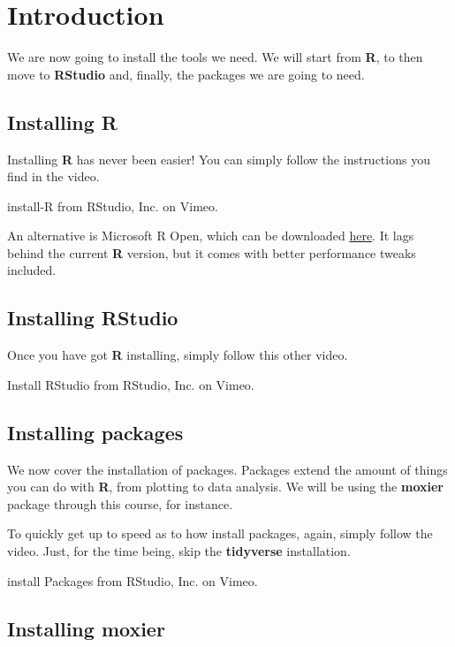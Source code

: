 \documentclass[]{book}
\begin{document}
\chapter{Introduction}\label{intro}

We are now going to install the tools we need. We will start from
\textbf{R}, to then move to \textbf{RStudio} and, finally, the packages
we are going to need.

\section{Installing R}\label{installing-r}

Installing \textbf{R} has never been easier! You can simply follow the
instructions you find in the video.

install-R from RStudio, Inc. on Vimeo.

An alternative is Microsoft R Open, which can be downloaded
\href{https://mran.microsoft.com/}{here}. It lags behind the current
\textbf{R} version, but it comes with better performance tweaks
included.

\section{Installing RStudio}\label{installing-rstudio}

Once you have got \textbf{R} installing, simply follow this other video.

Install RStudio from RStudio, Inc. on Vimeo.

\section{Installing packages}\label{installing-packages}

We now cover the installation of packages. Packages extend the amount of
things you can do with \textbf{R}, from plotting to data analysis. We
will be using the \textbf{moxier} package through this course, for
instance.

To quickly get up to speed as to how install packages, again, simply
follow the video. Just, for the time being, skip the \textbf{tidyverse}
installation.

install Packages from RStudio, Inc. on Vimeo.

\section{\texorpdfstring{Installing
\textbf{moxier}}{Installing moxier}}\label{installing-moxier}
\end{document}

